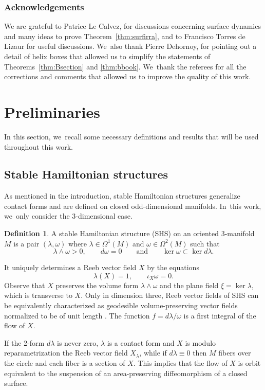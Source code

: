 \documentclass[11pt]{article}
\newcommand{\threemanifold}{$3$\nobreakdash-mani\-fold\xspace}
\theoremstyle{definition}
\newtheorem{defi}[theorem]{Definition}
\begin{document}
\subsubsection*{Acknowledgements}
We are grateful to Patrice Le Calvez, for discussions concerning surface dynamics and many ideas to prove Theorem~\ref{thm:surfirra}, and to Francisco Torres de Lizaur for useful discussions. We~also thank Pierre Dehornoy, for pointing out a detail of helix boxes that allowed us to simplify the statements of Theorems~\ref{thm:Bsection} and \ref{thm:bbook}. We~thank the referees for all the corrections and comments that allowed us to improve the quality of this work.

\section{Preliminaries}\label{sec:prelim}

In this section, we~recall some necessary definitions and results that will be used throughout this work.

\subsection{Stable Hamiltonian structures}\label{ss:SHS}

As mentioned in the introduction, stable Hamiltonian structures generalize contact forms and are defined on closed odd-dimensional manifolds. In~this work, we~only consider the 3-dimensional case.

\begin{defi}
A stable Hamiltonian structure (SHS) on an oriented \threemanifold~$M$ is a pair $(\lambda,\omega)$ where $\lambda \in \Omega^1(M)$ and $\omega \in \Omega^2(M)$ such that
\[
\lambda\wedge \omega>0, \qquad d\omega=0 \qquad \mbox{and} \qquad \ker \omega \subset \ker d\lambda.
\]
\end{defi}

It uniquely determines a Reeb vector field $X$ by the equations
\[
\lambda(X)=1,\qquad \iota_X\omega=0.
\]
Observe that $X$ preserves the volume form $\lambda\wedge \omega$ and the plane field $\xi=\ker \lambda$, which is transverse to $X$. Only in dimension three, Reeb vector fields of SHS can be equivalently characterized as geodesible volume-preserving vector fields normalized to be of unit length \cite{Re}. The function $f=d\lambda/\omega$ is a first integral of the flow of $X$.

If the 2-form $d\lambda$ is never zero, $\lambda$ is a contact form and $X$ is modulo reparametrization the Reeb vector field $X_\lambda$, while if $d\lambda\equiv 0$ then $M$ fibers over the circle and each fiber is a section of $X$. This implies that the flow of $X$ is orbit equivalent to
the suspension of an area-preserving diffeomorphism of a closed surface.
\end{document}
